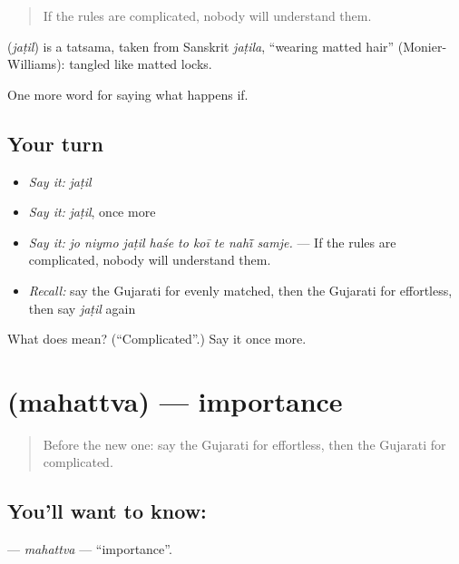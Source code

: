 \begin{quote}
If the rules are complicated, nobody will understand them.
\end{quote}

\begin{cousinweb}
\textbf{} (\emph{jaṭil}) is a tatsama, taken from Sanskrit \emph{jaṭila}, \textquotedblleft{}wearing matted hair\textquotedblright{} (Monier-Williams): tangled like matted locks.
\end{cousinweb}

\begin{grammarlens}[title={What you've built}]
One more word for saying what happens if.
\end{grammarlens}

\subsection*{Your turn}
\begin{itemize}
\raggedright
  \item \emph{Say it:} \emph{jaṭil}
  \item \emph{Say it:} \emph{jaṭil}, once more
  \item \emph{Say it:} \emph{jo niymo jaṭil haśe to koī te nahī̃ samje.} — If the rules are complicated, nobody will understand them.
  \item \emph{Recall:} say the Gujarati for evenly matched, then the Gujarati for effortless, then say \emph{jaṭil} again
\end{itemize}

\begin{tcolorbox}[breakable,colback=teal!4,colframe=teal!35!black,title={Before you move on}]
What does  mean? (\textquotedblleft{}Complicated\textquotedblright{}.) Say it once more.
\end{tcolorbox}
\section[\texorpdfstring{\gu{મહત્ત્વ} (mahattva)}{મહત્ત્વ (mahattva)}]{ (mahattva) — importance}

\label{lesson:GU-C545-mahattva}



\begin{quote}
Before the new one: say the Gujarati for effortless, then the Gujarati for complicated.
\end{quote}

\subsection*{You'll want to know: }
\textbf{} — \emph{mahattva} — \textquotedblleft{}importance\textquotedblright{}.


